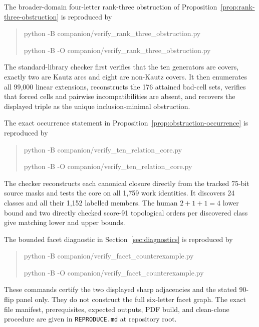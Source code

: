 \documentclass[11pt,a4paper]{article}
\theoremstyle{remark}
\begin{document}
The broader-domain four-letter rank-three obstruction of
Proposition~\ref{prop:rank-three-obstruction} is reproduced by
\begin{quote}\ttfamily\footnotesize\raggedright
python -B companion/verify\_rank\_three\_obstruction.py\par
python -B -O companion/verify\_rank\_three\_obstruction.py
\end{quote}
The standard-library checker first verifies that the ten generators are
covers, exactly two are Kautz arcs and eight are non-Kautz covers.  It then
enumerates all 99,000 linear extensions, reconstructs the 176 attained
bad-cell sets, verifies that forced cells and pairwise incompatibilities are
absent, and recovers the displayed triple as the unique inclusion-minimal
obstruction.

The exact occurrence statement in Proposition~\ref{prop:obstruction-occurrence}
is reproduced by
\begin{quote}\ttfamily\footnotesize\raggedright
python -B companion/verify\_ten\_relation\_core.py\par
python -B -O companion/verify\_ten\_relation\_core.py
\end{quote}
The checker reconstructs each canonical closure directly from the tracked
75-bit source masks and tests the core on all 1,759 work identities.  It
discovers 24 classes and all their
1,152 labelled members.  The human \(2+1+1=4\) lower bound and two directly
checked score-91 topological orders per discovered class give matching lower
and upper bounds.

The bounded facet diagnostic in Section~\ref{sec:diagnostics} is reproduced by
\begin{quote}\ttfamily\footnotesize\raggedright
python -B companion/verify\_facet\_counterexample.py\par
python -B -O companion/verify\_facet\_counterexample.py
\end{quote}
These commands certify the two displayed sharp adjacencies and the stated
90-flip panel only.  They do not construct the full six-letter facet graph.
The exact file manifest, prerequisites, expected outputs, PDF build, and
clean-clone procedure are given in \texttt{REPRODUCE.md} at repository root.



\end{document}
